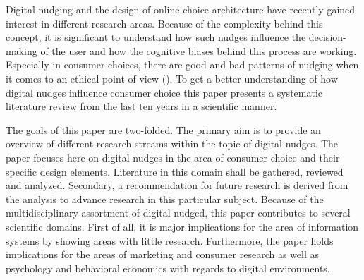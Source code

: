 Digital nudging and the design of online choice architecture have recently gained interest in different research areas. Because of the complexity behind this concept, it is significant to understand how such nudges influence the decision-making of the user and how the cognitive biases behind this process are working. Especially in consumer choices, there are good and bad patterns of nudging when it comes to an ethical point of view (\cite{sunstein_nudging_2015}). To get a better understanding of how digital nudges influence consumer choice this paper presents a systematic literature review from the last ten years in a scientific manner. 


The goals of this paper are two-folded. The primary aim is to provide an overview of different research streams within the topic of digital nudges. The paper focuses here on digital nudges in the area of consumer choice and their specific design elements.  Literature in this domain shall be gathered, reviewed and analyzed. Secondary, a recommendation for future research is derived from the analysis to advance research in this particular subject. Because of the multidisciplinary assortment of digital nudged, this paper contributes to several scientific domains. First of all, it is major implications for the area of information systems by showing areas with little research. Furthermore, the paper holds implications for the areas of marketing and consumer research as well as psychology and behavioral economics with regards to digital environments.
